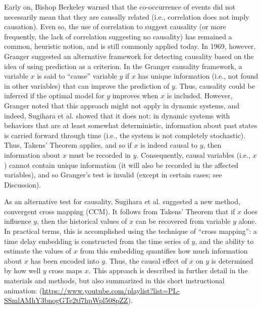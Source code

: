 Early on, Bishop Berkeley \cite{Berkeley_1710} warned that the co-occurrence of events did not necessarily mean that they are causally related (i.e., correlation does not imply causation). Even so, the use of correlation to suggest causality (or more frequently, the lack of correlation suggesting no causality) has remained a common, heuristic notion, and is still commonly applied today. In 1969, however, Granger \cite{Granger_1969} suggested an alternative framework for detecting causality based on the idea of using prediction as a criterion. In the Granger causality framework, a variable $x$ is said to ``cause'' variable $y$ if $x$ has unique information (i.e., not found in other variables) that can improve the prediction of $y$. Thus, causality could be inferred if the optimal model for $y$ improves when $x$ is included. However, Granger noted that this approach might not apply in dynamic systems, and indeed, Sugihara et al. \cite{Sugihara_2012} showed that it does not: in dynamic systems with behaviors that are at least somewhat deterministic, information about past states is carried forward through time (i.e., the system is not completely stochastic). Thus, Takens' Theorem \cite{Takens_1981} applies, and so if $x$ is indeed causal to $y$, then information about $x$ must be recorded in $y$. Consequently, causal variables (i.e., $x$) cannot contain unique information (it will also be recorded in the affected variables), and so Granger's test is invalid (except in certain cases; see Discussion). 

As an alternative test for causality, Sugihara et al. \cite{Sugihara_2012} suggested a new method, convergent cross mapping (CCM). It follows from Takens' Theorem \cite{Takens_1981} that if $x$ does influence $y$, then the historical values of $x$ can be recovered from variable $y$ alone. In practical terms, this is accomplished using the technique of ``cross mapping'': a time delay embedding is constructed from the time series of $y$, and the ability to estimate the values of $x$ from this embedding quantifies how much information about $x$ has been encoded into $y$. Thus, the causal effect of $x$ on $y$ is determined by how well $y$ cross maps $x$. This approach is described in further detail in the materials and methods, but also summarized in this short instructional animation: (\url{https://www.youtube.com/playlist?list=PL-SSmlAMhY3bnogGTe2tf7hpWpl508pZZ}).

